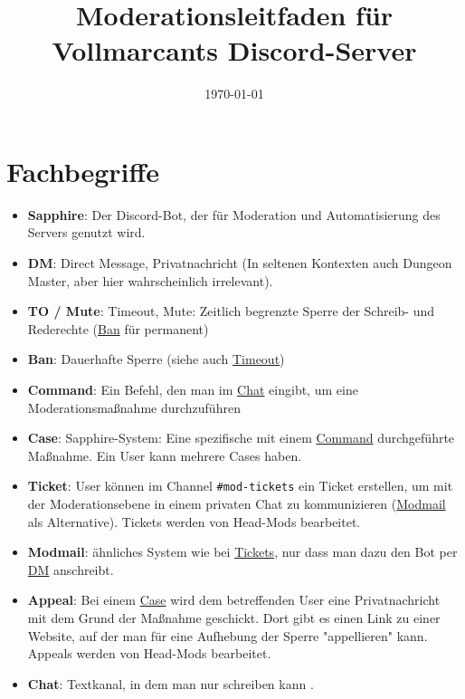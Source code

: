 \documentclass[a4paper,12pt]{article}
\title{Moderationsleitfaden für Vollmarcants Discord-Server}
\author{}
\date{\today}
\begin{document}
\maketitle

\section{Fachbegriffe}
\label{sec:fachbegriffe}
\begin{itemize}
    \item \textbf{Sapphire}\hypertarget{term:sapphire}{}: Der Discord-Bot, der für Moderation und Automatisierung des Servers genutzt wird.  
    \item \textbf{DM}\hypertarget{term:dm}{}: Direct Message, Privatnachricht (In seltenen Kontexten auch Dungeon Master, aber hier wahrscheinlich irrelevant).
    \item \textbf{TO / Mute}\hypertarget{term:to}{}: Timeout, Mute: Zeitlich begrenzte Sperre der Schreib- und Rederechte (\hyperlink{term:ban}{Ban} für permanent)
    \item \textbf{Ban}\hypertarget{term:ban}{}: Dauerhafte Sperre (siehe auch \hyperlink{term:to}{Timeout})
    \item \textbf{Command}\hypertarget{term:command}{}: Ein Befehl, den man im \hyperlink{term:chat}{Chat} eingibt, um eine Moderationsmaßnahme durchzuführen
    \item \textbf{Case}\hypertarget{term:case}{}: Sapphire-System: Eine spezifische mit einem \hyperlink{term:command}{Command} durchgeführte Maßnahme. Ein User kann mehrere Cases haben.
    \item \textbf{Ticket}\hypertarget{term:ticket}{}: User können im Channel \texttt{\#mod-tickets} ein Ticket erstellen, um mit der Moderationsebene in einem privaten Chat zu kommunizieren (\hyperlink{term:modmail}{Modmail} als Alternative). Tickets werden von Head-Mods bearbeitet.
    \item \textbf{Modmail}\hypertarget{term:modmail}{}: ähnliches System wie bei \hyperlink{term:ticket}{Tickets}, nur dass man dazu den Bot per \hyperlink{term:dm}{DM} anschreibt.
    \item \textbf{Appeal}\hypertarget{term:appeal}{}: Bei einem \hyperlink{term:case}{Case} wird dem betreffenden User eine Privatnachricht mit dem Grund der Maßnahme geschickt. Dort gibt es einen Link zu einer Website, auf der man für eine Aufhebung der Sperre "appellieren" kann. Appeals werden von Head-Mods bearbeitet.
    \item \textbf{Chat}\hypertarget{term:chat}{}: Textkanal, in dem man nur schreiben kann .

\end{itemize}
\end{document}
